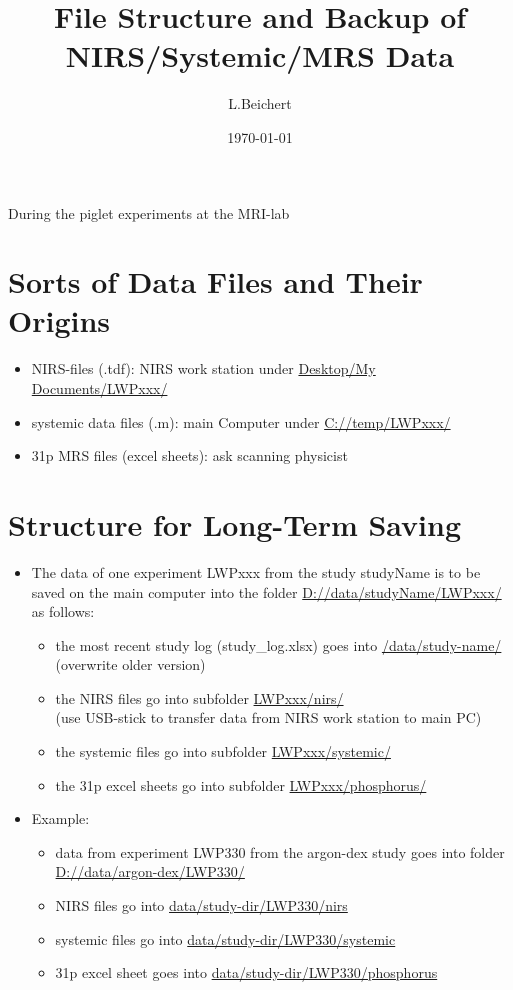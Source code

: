 \documentclass[11pt]{article}
\title{File Structure and Backup of NIRS/Systemic/MRS Data}
\author{L.Beichert}
\date{\today}
\begin{document}
\maketitle
\paragraph*{} During the piglet experiments at the MRI-lab 
\section*{Sorts of Data Files and Their Origins}
\begin{itemize}
\item NIRS-files (.tdf): NIRS work station under  \url{Desktop/My Documents/LWPxxx/} 
\item systemic data files (.m): main Computer under \url{C://temp/LWPxxx/}
\item 31p MRS files (excel sheets): ask scanning physicist
\end{itemize}

\section*{Structure for Long-Term Saving}
\begin{itemize}
\item The data of one experiment LWPxxx from the study studyName  is to be saved on the main computer into the folder \url{D://data/studyName/LWPxxx/} as follows:
\begin{itemize}
	\item the most recent study log (study\_log.xlsx) goes into \url{/data/study-name/} (overwrite older version)
	\item the NIRS files go into subfolder \url{LWPxxx/nirs/} \\(use USB-stick to transfer data from NIRS work station to main PC)
	\item the systemic files go into subfolder \url{LWPxxx/systemic/}
	\item the 31p excel sheets go into subfolder \url{LWPxxx/phosphorus/}
\end{itemize}
\item Example:
\begin{itemize}
	\item data from experiment LWP330 from the argon-dex study goes into folder \url{D://data/argon-dex/LWP330/}
	\item NIRS files go into \url{data/study-dir/LWP330/nirs}
	\item systemic files go into \url{data/study-dir/LWP330/systemic}
	\item 31p excel sheet goes into \url{data/study-dir/LWP330/phosphorus}
\end{itemize}

\end{itemize}
\end{document}
